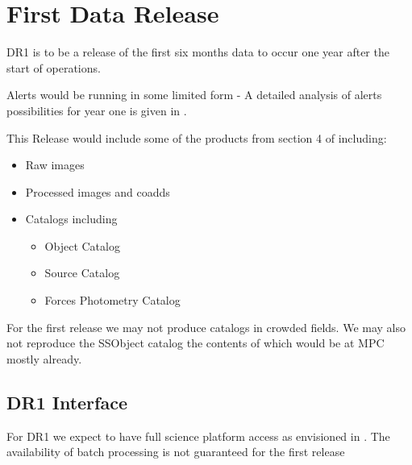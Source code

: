\section{First Data Release } \label{sect:dr1}

DR1 is to be a release of the first six months data to occur one year after the start of operations.

Alerts would be running in some limited form - A detailed analysis of alerts possibilities for year one is given in .


This Release would include some of the products from section 4 of \DPDD including:

\begin{itemize}
\item  Raw images
\item  Processed images and coadds
\item  Catalogs including

\begin{itemize}
\item Object Catalog
\item Source Catalog
\item Forces Photometry Catalog
\end{itemize}

\end{itemize}

For the first release we may not produce catalogs in crowded fields.
We may also not reproduce the SSObject catalog the  contents of which would be at MPC mostly already.

\subsection {DR1 Interface}
For DR1 we expect to have full science platform access as envisioned in .
The availability of batch processing is not guaranteed for the first release
